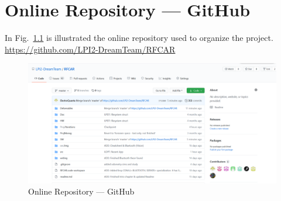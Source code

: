 \setcounter{table}{0}
\setcounter{figure}{0}
\chapter{Online Repository --- GitHub}%
\label{ch:append-github}
In Fig.~\ref{fig:github} is illustrated the online repository used to organize the project.\\
 \url{https://github.com/LPI2-DreamTeam/RFCAR}
\begin{figure}[!h]
  \centering
  \includegraphics[width=1.0\textwidth]{./img/append-github.png} 
  \caption{Online Repository --- GitHub}%
  \label{fig:github}
\end{figure}
% 
